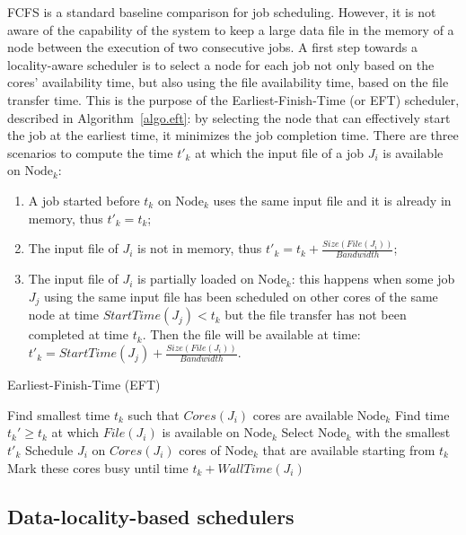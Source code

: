 \documentclass[conference]{IEEEtran}
\newcommand{\Node}[1]{\ensuremath{\mathrm{Node}_{#1}}\xspace}
\newcommand{\file}{\ensuremath{\mathit{File}}\xspace}
\newcommand{\size}{\ensuremath{\mathit{Size}}\xspace}
\newcommand{\bandwidth}{\mathit{Bandwidth}\xspace}
\newcommand{\core}{\mathit{Cores}\xspace}
\newcommand{\walltime}{\mathit{WallTime}\xspace}
\newcommand{\start}{\mathit{StartTime}\xspace}
\newcommand{\nodeset}{\ensuremath{\mathbb{N}}\xspace}
\begin{document}
FCFS is a standard baseline comparison
for job scheduling. However, it is not aware of the capability of the
system to keep a large data file in the memory of a node between the execution of
two consecutive jobs.
A first step towards a locality-aware scheduler
is to select a node for each job not only based on the cores' availability
time, but also using the file availability time, based on the file
transfer time. This is the purpose of the Earliest-Finish-Time (or
EFT) scheduler, described in Algorithm~\ref{algo.eft}: by selecting
the node that can effectively start the job at the earliest time, it
minimizes the job completion time. There are three scenarios to compute the
time $t'_k$ at which the input file of a job $J_i$ is available on
\Node{k}:
\begin{enumerate}
\item A job started before $t_k$ on \Node{k} uses the same input
  file and it is already in memory, thus $t'_k=t_k$;
\item The input file of $J_i$ is not in memory, thus
  $t'_k=t_k+\frac{\size(\file(J_i))}{\bandwidth}$;
\item The input file of $J_i$ is partially loaded on \Node{k}: this
  happens when some
  job $J_j$ using the same input file has been scheduled on other cores of
  the same node at time $\start(J_j)<t_k$ but the file transfer has not been
  completed at time $t_k$. Then the file will be available at time:
  $t'_k = \start(J_j)+\frac{\size(\file(J_i))}{\bandwidth}.$
\end{enumerate}

		
\begin{algorithm}[htbp]%
\caption{Earliest-Finish-Time (EFT)}\label{algo.eft}
\begin{algorithmic}[1]
		\ForEach{$\Node{k} \in \nodeset$}
			\State Find smallest time $t_k$ such that $\core(J_i)$ cores are available \Node{k}
			\State Find time $t_k' \geq t_k$ at which $\file(J_i)$ is available on $\Node{k}$ 
		\EndFor
                \State Select \Node{k}  with the smallest $t'_k$
                \State Schedule $J_i$ on $\core(J_i)$ cores of \Node{k} that are available starting from $t_k$
                \State Mark these cores busy until time $t_k +\walltime(J_i)$
	\EndFor
\end{algorithmic}
\end{algorithm}

\subsection{Data-locality-based schedulers}
\end{document}
